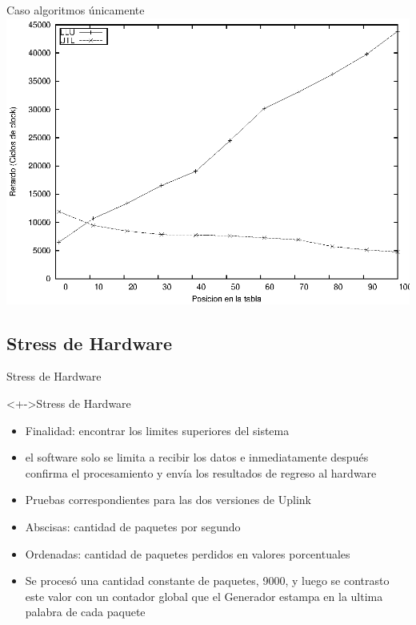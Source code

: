 \documentclass[xcolor=dvipsnames]{beamer}
\begin{document}
\begin{frame}{Caso algoritmos únicamente} 
\center	
\includegraphics[scale=0.70]{figures/llu-utlsof.eps} 
\end{frame}

\subsection{Stress de Hardware}

\begin{frame}{Stress de Hardware} 
\begin{block}<+->{Stress de Hardware}   
    \begin{itemize}
      \scriptsize
     	\item Finalidad: encontrar los limites superiores del sistema
     	\item el software solo se limita a recibir los datos e inmediatamente después confirma el procesamiento y envía los resultados de regreso al hardware
	\item Pruebas correspondientes para las dos versiones de Uplink
	\item Abscisas: cantidad de paquetes por segundo
	\item Ordenadas: cantidad de paquetes perdidos en valores porcentuales
	\item Se procesó una cantidad constante de paquetes, 9000, y luego se contrasto este valor con un contador global que el Generador estampa en la ultima palabra de cada paquete
    \end{itemize}
  \end{block}
\end{frame}
\end{document}

